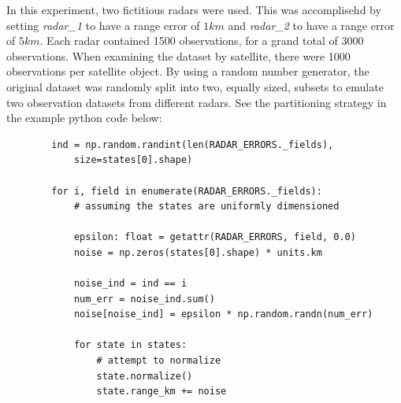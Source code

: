 \documentclass[./report_entry.tex]{subfiles}
\begin{document}
    \noindent In this experiment, two fictitious radars were used.  This was accomplisehd by setting \textit{radar\_1} to 
    have a range error of $1km$ and \textit{radar\_2} to have a range error of $5km$.  Each radar contained 1500 observations, for a grand total of
    3000 observations.  When examining the dataset by satellite, there were 1000 observations per satellite object.  By using a random number generator,
    the original dataset was randomly split into two, equally sized, subsets to emulate two observation datasets from different radars.
    See the partitioning strategy in the example python code below:
    
    \begin{verbatim}
        ind = np.random.randint(len(RADAR_ERRORS._fields), 
            size=states[0].shape)
    
        for i, field in enumerate(RADAR_ERRORS._fields):
            # assuming the states are uniformly dimensioned
            
            epsilon: float = getattr(RADAR_ERRORS, field, 0.0)
            noise = np.zeros(states[0].shape) * units.km
            
            noise_ind = ind == i
            num_err = noise_ind.sum()
            noise[noise_ind] = epsilon * np.random.randn(num_err)
            
            for state in states:
                # attempt to normalize
                state.normalize()
                state.range_km += noise
    \end{verbatim}
\end{document}
